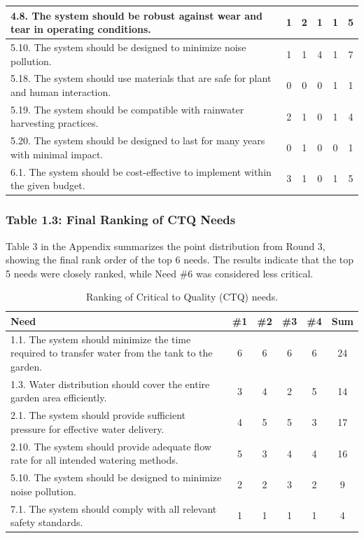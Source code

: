 \documentclass[12pt]{report}
\begin{document}
\begin{table}[H]
\begin{tabular}{|p{10cm}|c|c|c|c|c|}
4.8. The system should be robust against wear and tear in operating conditions. & 1 & 2 & 1 & 1 & 5 \\
\hline
5.10. The system should be designed to minimize noise pollution. & 1 & 1 & 4 & 1 & \cellcolor{yellow}7 \\
5.18. The system should use materials that are safe for plant and human interaction. & 0 & 0 & 0 & 1 & 1 \\
5.19. The system should be compatible with rainwater harvesting practices. & 2 & 1 & 0 & 1 & 4 \\
5.20. The system should be designed to last for many years with minimal impact. & 0 & 1 & 0 & 0 & 1 \\
\hline
6.1. The system should be cost-effective to implement within the given budget. & 3 & 1 & 0 & 1 & 5 \\
\hline
\end{tabular}
\end{table}

\subsubsection{Table 1.3: Final Ranking of CTQ Needs}
Table 3 in the Appendix summarizes the point distribution from Round 3, showing the final rank order of the top 6 needs. The results indicate that the top 5 needs were closely ranked, while Need \#6 was considered less critical.
\begin{table}[H]
\centering
\caption{Ranking of Critical to Quality (CTQ) needs.}
\begin{tabular}{|p{10cm}|c|c|c|c|c|}
\hline
\textbf{Need} & \textbf{\#1} & \textbf{\#2} & \textbf{\#3} & \textbf{\#4} & \textbf{Sum} \\
\hline
1.1. The system should minimize the time required to transfer water from the tank to the garden. & 6 & 6 & 6 & 6 & 24 \\
1.3. Water distribution should cover the entire garden area efficiently. & 3 & 4 & 2 & 5 & 14 \\
\hline
2.1. The system should provide sufficient pressure for effective water delivery. & 4 & 5 & 5 & 3 & 17 \\
2.10. The system should provide adequate flow rate for all intended watering methods. & 5 & 3 & 4 & 4 & 16 \\
\hline
5.10. The system should be designed to minimize noise pollution. & 2 & 2 & 3 & 2 & 9 \\
\hline
7.1. The system should comply with all relevant safety standards. & 1 & 1 & 1 & 1 & 4 \\
\hline
\end{tabular}
\end{table}
\end{document}
